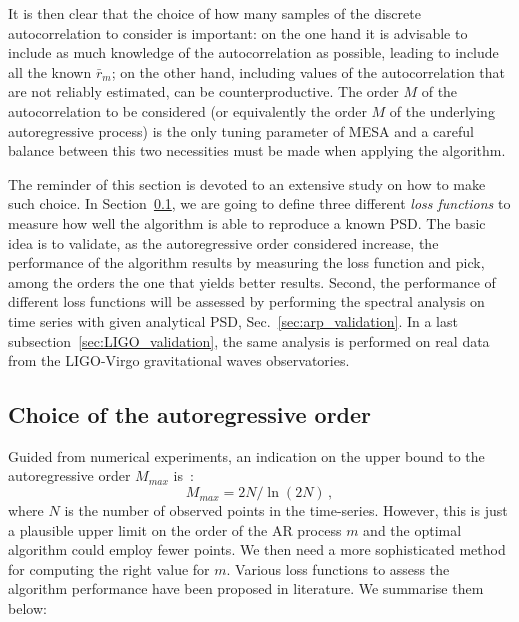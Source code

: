 \documentclass[twocolumn,showpacs,preprintnumbers,nofootinbib,prd,
superscriptaddress,10pt]{revtex4-1}
\begin{document}
It is then clear that the choice of how many samples of the discrete autocorrelation to consider is important: 
on the one hand it is advisable to include as much knowledge of the autocorrelation as possible, leading to include all the known $\bar{r}_m$; on the other hand, including values of the autocorrelation that are not reliably estimated, can be counterproductive.
The order $M$ of the autocorrelation to be considered (or equivalently the order $M$ of the underlying autoregressive process) is the only tuning parameter of MESA and a careful balance between this two necessities must be made when applying the algorithm.

The reminder of this section is devoted to an extensive study on how to make such choice.
In Section~\ref{sec:optimizers}, we are going to define three different \textit{loss functions} to measure how well the 
algorithm is able to reproduce a known PSD.
The basic idea is to validate, as the autoregressive order considered increase, the performance of the algorithm results 
by measuring the loss function and pick, among the orders the one that yields better results.
Second, the performance of different loss functions will be assessed by performing the spectral analysis on time series with given analytical PSD, Sec.~\ref{sec:arp_validation}.
In a last subsection~\ref{sec:LIGO_validation}, the same analysis is performed on real data from the LIGO-Virgo gravitational waves observatories.

\subsection{Choice of the autoregressive order}\label{sec:optimizers} 

Guided from numerical experiments, an indication on the upper bound to the autoregressive order $M_{max}$ is~\cite{doi:10.1190/1.1440902}:
\begin{equation}\label{eq:MMAx}
M_{max} = 2N / \ln{(2N)}\,,
\end{equation}
where $N$ is the number of observed points in the time-series.
However, this is just a plausible upper limit on the order of the AR process $m$ and the optimal algorithm could employ fewer points.
We then need a more sophisticated method for computing the right value for $m$.
Various loss functions to assess the algorithm performance have been proposed in literature.
We summarise them below:
\end{document}
